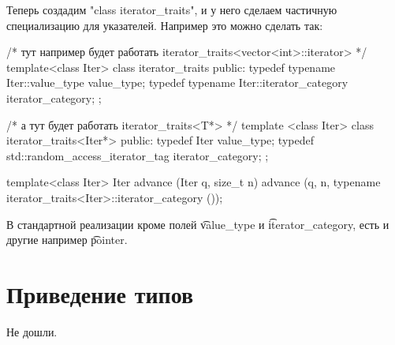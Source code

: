 Теперь создадим \cpp"class iterator_traits", и у него сделаем частичную специализацию для указателей.
Например это можно сделать так:
\begin{cppcode}
/* тут например будет работать iterator_traits<vector<int>::iterator> */
template<class Iter>
class iterator_traits {
public:
    typedef typename Iter::value_type value_type;
    typedef typename Iter::iterator_category iterator_category;
};

/* а тут будет работать iterator_traits<T*> */
template <class Iter> 
class iterator_traits<Iter*> {
public:
    typedef Iter value_type;
    typedef std::random_access_iterator_tag iterator_category;
};

template<class Iter>
Iter advance (Iter q, size_t n) {
    advance (q, n, typename iterator_traits<Iter>::iterator_category ());
}
\end{cppcode}
В стандартной реализации кроме полей \t{value\_type} и \t{iterator\_category}, есть и другие например \t{pointer}.

\section{Приведение типов}
Не дошли. 